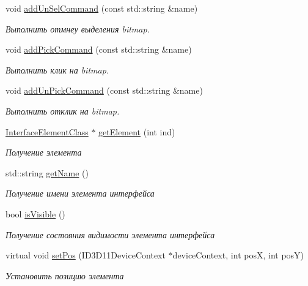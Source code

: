 \begin{DoxyCompactItemize}
void \hyperlink{class_list_element_class_a8a8930b7a1872ec1aa78be2a1fe4adc6}{add\+Un\+Sel\+Command} (const std\+::string \&name)
\begin{DoxyCompactList}\small\item\em Выполнить отмнеу выделения bitmap. \end{DoxyCompactList}\item 
void \hyperlink{class_list_element_class_afa7a26828a046b781f52255b78a4ba2e}{add\+Pick\+Command} (const std\+::string \&name)
\begin{DoxyCompactList}\small\item\em Выполнить клик на bitmap. \end{DoxyCompactList}\item 
void \hyperlink{class_list_element_class_a0dc213a87089450f5b18297b6e56673e}{add\+Un\+Pick\+Command} (const std\+::string \&name)
\begin{DoxyCompactList}\small\item\em Выполнить отклик на bitmap. \end{DoxyCompactList}\item 
\hyperlink{class_interface_element_class}{Interface\+Element\+Class} $\ast$ \hyperlink{class_list_element_class_aaec0cdf8ec3c6a2e9e92cbc33d366b65}{get\+Element} (int ind)
\begin{DoxyCompactList}\small\item\em Получение элемента \end{DoxyCompactList}\item 
std\+::string \hyperlink{class_interface_element_class_a7815b1d9629ff4dc8a83c170dbb171fc}{get\+Name} ()
\begin{DoxyCompactList}\small\item\em Получение имени элемента интерфейса \end{DoxyCompactList}\item 
bool \hyperlink{class_interface_element_class_a8d2250d84fd5bd69683dd3fe98becafd}{is\+Visible} ()
\begin{DoxyCompactList}\small\item\em Получение состояния видимости элемента интерфейса \end{DoxyCompactList}\item 
virtual void \hyperlink{class_interface_element_class_a15833d13e7a9c045032bf8498f25b9e6}{set\+Pos} (I\+D3\+D11\+Device\+Context $\ast$device\+Context, int posX, int posY)
\begin{DoxyCompactList}\small\item\em Установить позицию элемента \end{DoxyCompactList}\item 

\end{DoxyCompactItemize}
